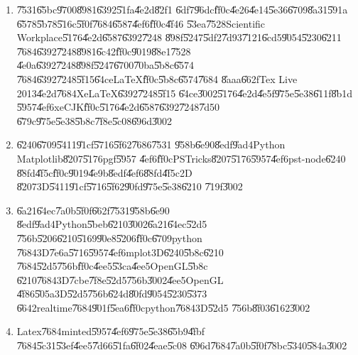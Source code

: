 \begin{enumerate}
\item \U{7531}\U{65bc}\U{9700}\U{8981}\U{6392}\U{51fa}\U{4e2d}\U{82f1}%
\U{6df7}\U{96dc}\U{ff0c}\U{4e26}\U{4e14}\U{5e36}\U{6709}\U{8a31}\U{591a}%
\U{6578}\U{5b78}\U{516c}\U{5f0f}\U{7684}\U{6587}\U{4ef6}\U{ff0c}\U{4f46}%
\U{53ea}\U{7528}Scientific Workplace\U{5176}\U{4e2d}\U{6587}\U{6392}\U{7248}%
\U{898f}\U{5247}\U{5df2}\U{7d93}\U{7121}\U{6cd5}\U{9054}\U{5230}\U{6211}%
\U{7684}\U{6392}\U{7248}\U{8981}\U{6c42}\U{ff0c}\U{9019}\U{88e1}\U{7528}%
\U{4e0a}\U{6392}\U{7248}\U{898f}\U{5247}\U{6700}\U{70ba}\U{5b8c}\U{6574}%
\U{7684}\U{6392}\U{7248}\U{5f15}\U{64ce}LaTeX\U{ff0c}\U{5b8c}\U{6574}\U{7684}%
\U{8aaa}\U{662f}Tex Live 2013\U{4e2d}\U{7684}XeLaTeX\U{6392}\U{7248}\U{5f15}%
\U{64ce}\U{3002}\U{5176}\U{4e2d}\U{4e5f}\U{975e}\U{5e38}\U{611f}\U{8b1d}%
\U{5957}\U{4ef6}xeCJK\U{ff0c}\U{5176}\U{4e2d}\U{6587}\U{6392}\U{7248}\U{7d50}%
\U{679c}\U{975e}\U{5e38}\U{5b8c}\U{7f8e}\U{5c08}\U{696d}\U{3002}

\item \U{6240}\U{6709}\U{5411}\U{91cf}\U{5716}\U{5f62}\U{7686}\U{7531}%
\U{958b}\U{6e90}\U{8edf}\U{9ad4}Python Matplotlib\U{8207}\U{5176}pgf\U{5957}%
\U{4ef6}\U{ff0c}PSTricks\U{8207}\U{5176}\U{5957}\U{4ef6}pst-node\U{6240}%
\U{88fd}\U{4f5c}\U{ff0c}\U{9019}\U{4e9b}\U{8edf}\U{4ef6}\U{88fd}\U{4f5c}2D%
\U{8207}3D\U{5411}\U{91cf}\U{5716}\U{5f62}\U{90fd}\U{975e}\U{5e38}\U{6210}%
\U{719f}\U{3002}

\item \U{6a21}\U{64ec}\U{7a0b}\U{5f0f}\U{662f}\U{7531}\U{958b}\U{6e90}%
\U{8edf}\U{9ad4}Python\U{5beb}\U{6210}\U{3002}\U{6a21}\U{64ec}\U{52d5}%
\U{756b}\U{5206}\U{6210}\U{5169}\U{90e8}\U{5206}\U{ff0c}\U{6709}python%
\U{7684}3D\U{7e6a}\U{5716}\U{5957}\U{4ef6}mplot3D\U{6240}\U{5b8c}\U{6210}%
\U{7684}\U{52d5}\U{756b}\U{ff0c}\U{4ee5}\U{53ca}\U{4ee5}OpenGL\U{5b8c}%
\U{6210}\U{7684}3D\U{7cbe}\U{7f8e}\U{52d5}\U{756b}\U{3002}\U{4ee5}OpenGL%
\U{4f86}\U{505a}3D\U{52d5}\U{756b}\U{624d}\U{80fd}\U{9054}\U{5230}\U{5373}%
\U{6642}realtime\U{7684}\U{901f}\U{5ea6}\U{ff0c}python\U{7684}3D\U{52d5}%
\U{756b}\U{8f03}\U{6162}\U{3002}

\item Latex\U{7684}minted\U{5957}\U{4ef6}\U{975e}\U{5e38}\U{65b9}\U{4fbf}%
\U{7684}\U{5c31}\U{53ef}\U{4ee5}\U{7d66}\U{51fa}\U{6f02}\U{4eae}\U{5c08}%
\U{696d}\U{7684}\U{7a0b}\U{5f0f}\U{78bc}\U{5340}\U{584a}\U{3002}


\end{enumerate}
